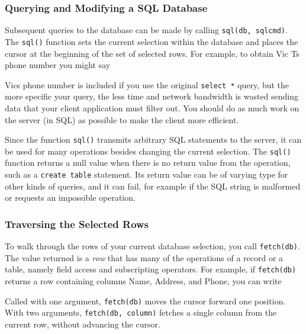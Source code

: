 \subsubsection{Querying and Modifying a SQL Database}

Subsequent queries to the database can be made by calling
\texttt{sql(db, sqlcmd)}. The \texttt{sql()} function sets
the current selection within the database and places the cursor at the
beginning of the set of selected rows. For example, to obtain Vic
T{\textquotesingle}s phone number you might say


Vic{\textquotesingle}s phone number is included if you use the original
\texttt{select *} query, but the more specific your query, the less
time and network bandwidth is wasted sending data that your client
application must filter out. You should do as much work on the server
(in SQL) as possible to make the client more efficient.

Since the function \texttt{sql()} transmits arbitrary SQL statements to
the server, it can be used for many operations besides changing the
current selection. The \texttt{sql()} function returns a null value
when there is no return value from the operation, such as a
\texttt{create table} statement. Its return value can be of varying
type for other kinds of queries, and it can fail, for example if the
SQL string is malformed or requests an impossible operation.

\subsubsection{Traversing the Selected Rows}

To walk through the rows of your current database selection, you call
\texttt{fetch(db)}. The value returned is a
\textit{row} that has many of the operations of a record or a table,
namely field access and subscripting operators. For example, if
\texttt{fetch(db)} returns a row containing columns Name, Address, and
Phone, you can write


Called with one argument, \texttt{fetch(db)} moves the cursor forward
one position. With two arguments, \texttt{fetch(db, column)} fetches a
single column from the current row, without advancing the cursor.

